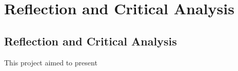 \documentclass[a4paper,11pt]{report}
\begin{document}




%
%
%
%





\part{Reflection and Critical Analysis}
\chapter{Reflection and Critical Analysis}
This project aimed to present 
\end{document}
